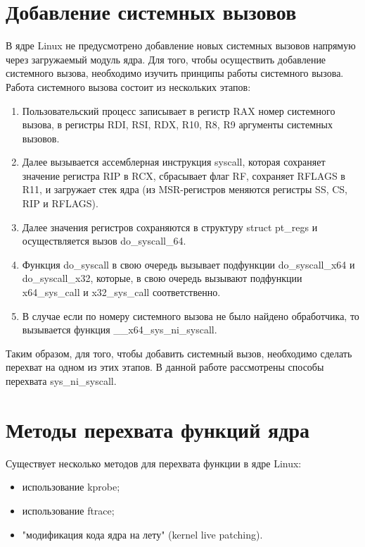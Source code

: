 \documentclass{bmstu}
\begin{document}
\section{Добавление системных вызовов}
В ядре Linux не предусмотрено добавление новых системных вызовов напрямую через загружаемый модуль ядра. Для того, чтобы осуществить добавление системного вызова, необходимо изучить принципы работы системного вызова.
Работа системного вызова состоит из нескольких этапов:%
\begin{enumerate}
	\item Пользовательский процесс записывает в регистр RAX номер системного вызова, в регистры RDI, RSI, RDX, R10, R8, R9 аргументы системных вызовов.
	\item Далее вызывается ассемблерная инструкция syscall, которая сохраняет значение регистра RIP в RCX, сбрасывает флаг RF, сохраняет RFLAGS в R11, и загружает стек ядра (из MSR-регистров меняются регистры SS, CS, RIP и RFLAGS).
	\item Далее значения регистров сохраняются в структуру struct pt\_regs и осуществляется вызов do\_syscall\_64.
	\item Функция do\_syscall в свою очередь вызывает подфункции do\_syscall\_x64 и do\_syscall\_x32, которые, в свою очередь вызывают подфункции x64\_sys\_call и x32\_sys\_call соответственно. %
	\item В случае если по номеру системного вызова не было найдено обработчика, то вызывается функция \_\_x64\_sys\_ni\_syscall. %
\end{enumerate}

Таким образом, для того, чтобы добавить системный вызов, необходимо сделать перехват на одном из этих этапов. В данной работе рассмотрены способы перехвата sys\_ni\_syscall. %

\section{Методы перехвата функций ядра}
Существует несколько методов для перехвата функции в ядре Linux:
\begin{itemize}
	\item использование kprobe;
	\item использование ftrace;
	\item "модификация кода ядра на лету" (kernel live patching).
\end{itemize}
\end{document}
